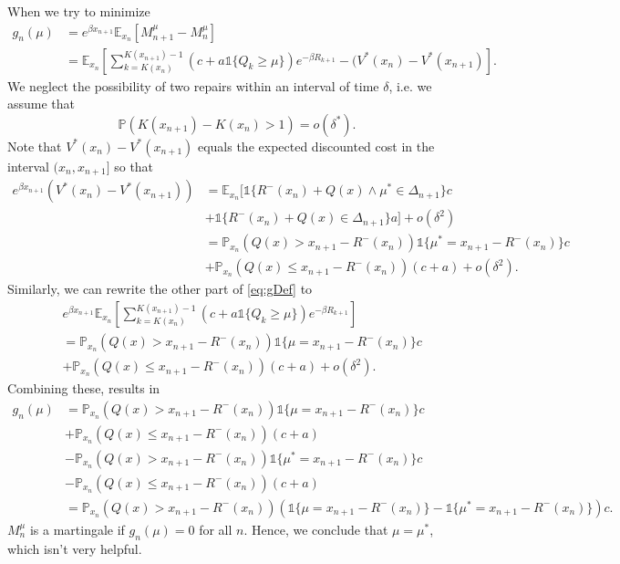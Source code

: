 When we try to minimize
\begin{equation}\label{eq:gDef}
\begin{split}
g_n(\mu)&=e^{\beta x_{n+1}}\mathbb{E}_{x_n}[M_{n+1}^\mu-M_n^\mu]\\
&=\mathbb{E}_{x_n}[\sum\limits_{k=K(x_n)}^{K(x_{n+1})-1}(c+a\mathds{1}\{Q_k\geq\mu\})e^{-\beta R_{k+1}}-(V^*(x_n)-V^*(x_{n+1})].
\end{split}
\end{equation}
We neglect the possibility of two repairs within an interval of time $\delta$, i.e. we assume that
\begin{equation}
\mathbb{P}(K(x_{n+1})-K(x_n)>1)=o(\delta^*).
\end{equation}
Note that $V^*(x_n)-V^*(x_{n+1})$ equals the expected discounted cost in the interval $(x_n,x_{n+1}]$ so that
\begin{equation}
\begin{split}
e^{\beta x_{n+1}}(V^*(x_n)-V^*(x_{n+1}))&=\mathbb{E}_{x_n}[\mathds{1}\{R^-(x_n)+Q(x)\wedge\mu^*\in\Delta_{n+1}\}c\\
&+\mathds{1}\{R^-(x_n)+Q(x)\in\Delta_{n+1}\}a]+o(\delta^2)\\
&=\mathbb{P}_{x_n}(Q(x)> x_{n+1}-R^-(x_n))\mathds{1}\{\mu^*=x_{n+1}-R^-(x_n)\}c \\
&+ \mathbb{P}_{x_n}(Q(x)\leq x_{n+1}-R^-(x_n))(c+a)+o(\delta^2).
\end{split}
\end{equation}
Similarly, we can rewrite the other part of \eqref{eq:gDef} to
\begin{equation}
\begin{split}
&e^{\beta x_{n+1}}\mathbb{E}_{x_n}[\sum\limits_{k=K(x_n)}^{K(x_{n+1})-1}(c+a\mathds{1}\{Q_k\geq\mu\})e^{-\beta R_{k+1}}]\\
&=\mathbb{P}_{x_n}(Q(x)> x_{n+1}-R^-(x_n))\mathds{1}\{\mu=x_{n+1}-R^-(x_n)\}c\\
&+\mathbb{P}_{x_n}(Q(x)\leq x_{n+1}-R^-(x_n))(c+a)+o(\delta^2).
\end{split}
\end{equation}
Combining these, results in
\begin{equation}
\begin{split}
g_n(\mu)&=\mathbb{P}_{x_n}(Q(x)> x_{n+1}-R^-(x_n))\mathds{1}\{\mu=x_{n+1}-R^-(x_n)\}c\\
&+\mathbb{P}_{x_n}(Q(x)\leq x_{n+1}-R^-(x_n))(c+a)\\
&-\mathbb{P}_{x_n}(Q(x)> x_{n+1}-R^-(x_n))\mathds{1}\{\mu^*=x_{n+1}-R^-(x_n)\}c \\
&- \mathbb{P}_{x_n}(Q(x)\leq x_{n+1}-R^-(x_n))(c+a)\\
&=\mathbb{P}_{x_n}(Q(x)> x_{n+1}-R^-(x_n))(\mathds{1}\{\mu=x_{n+1}-R^-(x_n)\}-\mathds{1}\{\mu^*=x_{n+1}-R^-(x_n)\})c.
\end{split}
\end{equation}
$M_n^\mu$ is a martingale if $g_n(\mu)=0$ for all $n$.
Hence, we conclude that $\mu=\mu^*$, which isn't very helpful.

